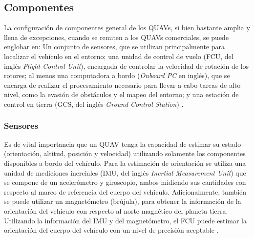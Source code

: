 \subsection{Componentes}

La configuración de componentes general de los QUAVs, si bien bastante amplia y llena de excepciones, cuando se remiten a los QUAVs comerciales, se puede englobar en: Un conjunto de sensores, que se utilizan principalmente para localizar el vehículo en el entorno; una unidad de control de vuelo (FCU, del inglés \textit{Flight Control Unit}), encargada de controlar la velocidad de rotación de los rotores; al menos una computadora a bordo (\textit{Onboard PC} en inglés), que se encarga de realizar el procesamiento necesario para llevar a cabo tareas de alto nivel, como la evasión de obstáculos y el mapeo del entorno; y una estación de control en tierra (GCS, del inglés \textit{Ground Control Station}) \cite{multidrone2017review}. 

\subsubsection{Sensores}
\label{sec:QUAV-sensors}

Es de vital importancia que un QUAV tenga la capacidad de estimar su estado (orientación, altitud, posición y velocidad) utilizando solamente los componentes disponibles a bordo del vehículo. Para la estimación de orientación se utiliza una unidad de mediciones inerciales \cite{multidrone2017review} (IMU, del inglés \textit{Inertial Measurement Unit}) que se compone de un acelerómetro y giroscopio, ambos midiendo sus cantidades con respecto al marco de referencia del cuerpo del vehículo. Adicionalmente, también se puede utilizar un magnetómetro (brújula), para obtener la información de la orientación del vehículo con respecto al norte magnético del planeta tierra. Utilizando la información del IMU y del magnetómetro, el FCU puede estimar la orientación del cuerpo del vehículo con un nivel de precisión aceptable \cite{multidrone2017review}. 

